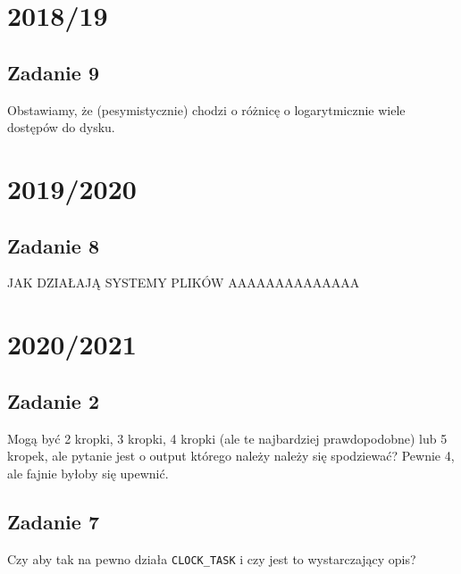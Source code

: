 \section{2018/19}
    \subsection{Zadanie 9}
        Obstawiamy, że (pesymistycznie) chodzi o różnicę o logarytmicznie wiele dostępów do dysku.
        
\section{2019/2020}
    \subsection{Zadanie 8}
        JAK DZIAŁAJĄ SYSTEMY PLIKÓW AAAAAAAAAAAAAA

\section{2020/2021}
    \subsection{Zadanie 2}
    Mogą być 2 kropki, 3 kropki, 4 kropki (ale te najbardziej prawdopodobne) lub 5 kropek, ale pytanie jest o output którego należy należy się spodziewać? Pewnie 4, ale fajnie byłoby się upewnić.
    
    \subsection{Zadanie 7}
    Czy aby tak na pewno działa \texttt{CLOCK\_TASK} i czy jest to wystarczający opis? 
    
